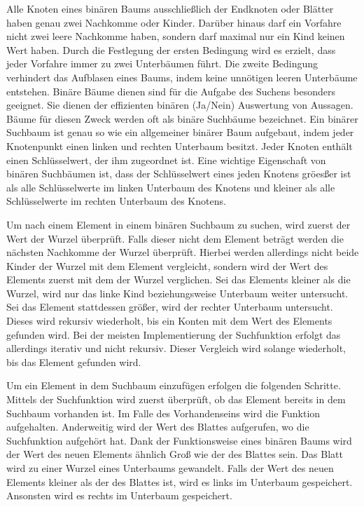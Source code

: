 Alle Knoten eines binären Baums ausschließlich der Endknoten oder Blätter haben genau zwei Nachkomme oder Kinder. Darüber hinaus darf ein Vorfahre nicht zwei leere Nachkomme haben, sondern darf maximal nur ein Kind keinen Wert haben. Durch die Festlegung der ersten Bedingung wird es erzielt, dass jeder Vorfahre immer zu zwei Unterbäumen führt. Die zweite Bedingung verhindert das Aufblasen eines Baums, indem keine unnötigen leeren Unterbäume entstehen. Binäre Bäume dienen sind für die Aufgabe des Suchens besonders geeignet. Sie dienen der effizienten binären (Ja/Nein) Auswertung von Aussagen. Bäume für diesen Zweck werden oft als binäre Suchbäume bezeichnet. Ein binärer Suchbaum ist genau so wie ein allgemeiner binärer Baum aufgebaut, indem jeder Knotenpunkt einen linken und rechten Unterbaum besitzt. Jeder Knoten enthält einen Schlüsselwert, der ihm zugeordnet ist. Eine wichtige Eigenschaft von binären Suchbäumen ist, dass der Schlüsselwert eines jeden Knotens gröesßer ist als alle Schlüsselwerte im linken Unterbaum des Knotens und kleiner als alle Schlüsselwerte im rechten Unterbaum des Knotens. \autocite[94-95]{ollmert_datenstrukturen_2020}

Um nach einem Element in einem binären Suchbaum zu suchen, wird zuerst der Wert der Wurzel überprüft. Falls dieser nicht dem Element beträgt werden die nächsten Nachkomme der Wurzel überprüft. Hierbei werden allerdings nicht beide Kinder der Wurzel mit dem Element vergleicht, sondern wird der Wert des Elements zuerst mit dem der Wurzel verglichen. Sei das Elements kleiner als die Wurzel, wird nur das linke Kind beziehungsweise Unterbaum weiter untersucht. Sei das Element stattdessen größer, wird der rechter Unterbaum untersucht. Dieses wird rekursiv wiederholt, bis ein Konten mit dem Wert des Elements gefunden wird. Bei der meisten Implementierung der Suchfunktion erfolgt das allerdings iterativ und nicht rekursiv. Dieser Vergleich wird solange wiederholt, bis das Element gefunden wird. \autocite[139-140]{knebl_algorithmen_2021}

Um ein Element in dem Suchbaum einzufügen erfolgen die folgenden Schritte. Mittels der Suchfunktion wird zuerst überprüft, ob das Element bereits in dem Suchbaum vorhanden ist. Im Falle des Vorhandenseins wird die Funktion aufgehalten. Anderweitig wird der Wert des Blattes aufgerufen, wo die Suchfunktion aufgehört hat. Dank der Funktionsweise eines binären Baums wird der Wert des neuen Elements ähnlich Groß wie der des Blattes sein. Das Blatt wird zu einer Wurzel eines Unterbaums gewandelt. Falls der Wert des neuen Elements kleiner als der des Blattes ist, wird es links im Unterbaum gespeichert. Ansonsten wird es rechts im Unterbaum gespeichert. \autocite[140]{knebl_algorithmen_2021}

